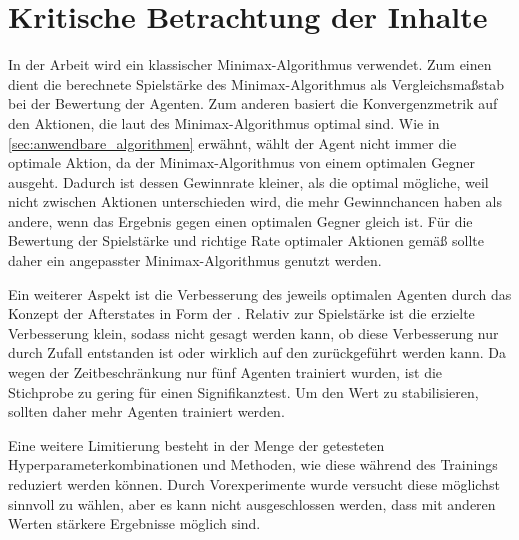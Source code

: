 \section{Kritische Betrachtung der Inhalte}
In der Arbeit wird ein klassischer Minimax-Algorithmus verwendet. 
Zum einen dient die berechnete Spielstärke des Minimax-Algorithmus als Vergleichsmaßstab bei der Bewertung der Agenten. 
Zum anderen basiert die Konvergenzmetrik auf den Aktionen, die laut des Minimax-Algorithmus optimal sind. 
Wie in \cref{sec:anwendbare_algorithmen} erwähnt, wählt der Agent nicht immer die optimale Aktion, da der Minimax-Algorithmus von einem optimalen Gegner ausgeht. 
Dadurch ist dessen Gewinnrate kleiner, als die optimal mögliche, weil nicht zwischen Aktionen unterschieden wird, die mehr Gewinnchancen haben als andere, wenn das Ergebnis gegen einen optimalen Gegner gleich ist. 
Für die Bewertung der Spielstärke und richtige Rate optimaler Aktionen gemäß \splay sollte daher ein angepasster Minimax-Algorithmus genutzt werden.

Ein weiterer Aspekt ist die Verbesserung des jeweils optimalen Agenten durch das Konzept der Afterstates in Form der \wtable. Relativ zur Spielstärke ist die erzielte Verbesserung klein, sodass nicht gesagt werden kann, ob diese Verbesserung nur durch Zufall entstanden ist oder wirklich auf den \wtable zurückgeführt werden kann. Da wegen der Zeitbeschränkung nur fünf Agenten trainiert wurden, ist die Stichprobe zu gering für einen Signifikanztest. Um den Wert zu stabilisieren, sollten daher mehr Agenten trainiert werden.

Eine weitere Limitierung besteht in der Menge der getesteten Hyperparameterkombinationen und Methoden, wie diese während des Trainings reduziert werden können. Durch Vorexperimente wurde versucht diese möglichst sinnvoll zu wählen, aber es kann nicht ausgeschlossen werden, dass mit anderen Werten stärkere Ergebnisse möglich sind.


